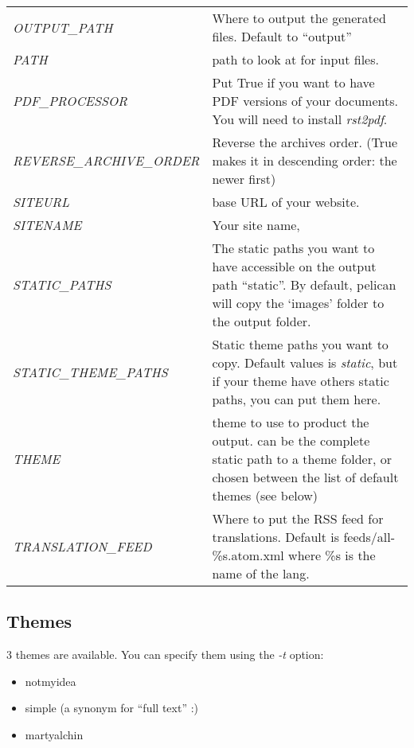 \documentclass[letterpaper,10pt,english]{manual}
\begin{document}
\begin{tabulary}{\textwidth}{|L|L|}
\emph{OUTPUT\_PATH}
 & 
Where to output the generated files. Default to
``output''
\\

\emph{PATH}
 & 
path to look at for input files.
\\

\emph{PDF\_PROCESSOR}
 & 
Put True if you want to have PDF versions of your
documents. You will need to install \emph{rst2pdf}.
\\

\emph{REVERSE\_ARCHIVE\_ORDER}
 & 
Reverse the archives order. (True makes it in
descending order: the newer first)
\\

\emph{SITEURL}
 & 
base URL of your website.
\\

\emph{SITENAME}
 & 
Your site name,
\\

\emph{STATIC\_PATHS}
 & 
The static paths you want to have accessible on the
output path ``static''. By default, pelican will copy
the `images' folder to the output folder.
\\

\emph{STATIC\_THEME\_PATHS}
 & 
Static theme paths you want to copy. Default values
is \emph{static}, but if your theme have others static paths,
you can put them here.
\\

\emph{THEME}
 & 
theme to use to product the output. can be the
complete static path to a theme folder, or chosen
between the list of default themes (see below)
\\

\emph{TRANSLATION\_FEED}
 & 
Where to put the RSS feed for translations. Default
is feeds/all-\%s.atom.xml where \%s is the name of the
lang.
\\
\hline
\end{tabulary}



\subsection{Themes}

3 themes are available. You can specify them using the \emph{-t} option:
\begin{itemize}
\item {} 
notmyidea

\item {} 
simple (a synonym for ``full text'' :)

\item {} 
martyalchin

\end{itemize}
\end{document}
